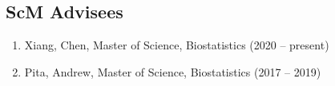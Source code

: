 \documentclass[12pt]{article}
\newcommand{\dn}[1]{{\color{black} {#1}}}
\newcommand{\myben}[1]{\smallskip\begin{enumerate}[start=1,label={\scriptsize \arabic*$\ $},leftmargin=\parindent]\setlength{\itemsep}{#1}\vspace*{-0.7em}}
\newcommand{\ee}{\end{enumerate}}
\newcommand{\mylift}[1]{\vspace*{#1}}
\begin{document}
\subsection*{ScM Advisees}
\myben{-0.1em}
\item Xiang, Chen, Master of Science, Biostatistics (2020 -- present)
\item Pita, Andrew, Master of Science, Biostatistics (2017 -- 2019)
\ee
\mylift{-1.5em}
%
%
%
%
%
%
%
%
%
%
%
%
%
%
\end{document}
